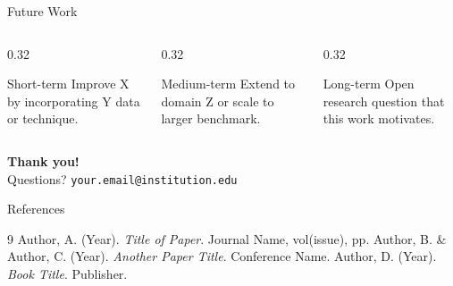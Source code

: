 \documentclass[aspectratio=169]{beamer}
\begin{document}
\begin{frame}{Future Work}
  \begin{columns}[T]
    \begin{column}{0.32\textwidth}
      \begin{block}{\centering Short-term}
        \centering
        \vspace{0.3em}
        Improve X by incorporating Y data or technique.
        \vspace{0.3em}
      \end{block}
    \end{column}
    \begin{column}{0.32\textwidth}
      \begin{block}{\centering Medium-term}
        \centering
        \vspace{0.3em}
        Extend to domain Z or scale to larger benchmark.
        \vspace{0.3em}
      \end{block}
    \end{column}
    \begin{column}{0.32\textwidth}
      \begin{block}{\centering Long-term}
        \centering
        \vspace{0.3em}
        Open research question that this work motivates.
        \vspace{0.3em}
      \end{block}
    \end{column}
  \end{columns}
  \vspace{1em}
  \centering
  \large\textbf{Thank you!}\\[0.5em]
  \normalsize Questions? \quad \texttt{your.email@institution.edu}
\end{frame}

\begin{frame}[allowframebreaks]{References}
  \begin{thebibliography}{9}
     Author, A. (Year). \textit{Title of Paper}. Journal Name, vol(issue), pp.
     Author, B. \& Author, C. (Year). \textit{Another Paper Title}. Conference Name.
     Author, D. (Year). \textit{Book Title}. Publisher.
  \end{thebibliography}
\end{frame}
\end{document}
